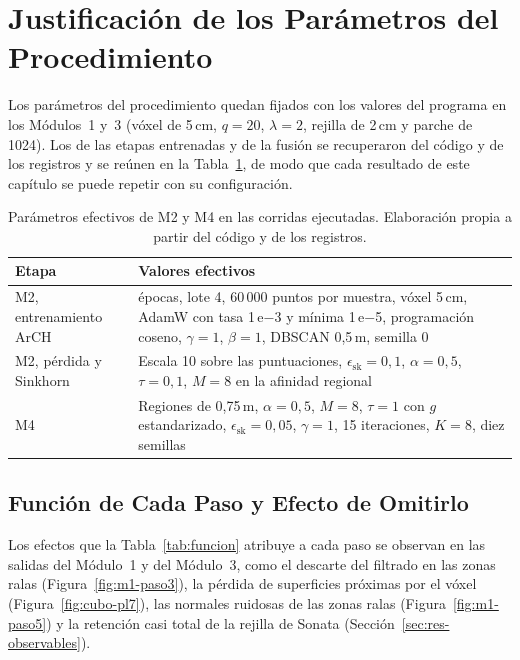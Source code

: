 \section[Justificación de los Parámetros del Procedimiento]{Justificación de los Parámetros del Procedimiento}
\label{sec:res-parametros}

Los parámetros del procedimiento quedan fijados con los valores del
programa en los Módulos~1 y~3 (vóxel de 5\,cm, $q=20$, $\lambda=2$, rejilla de 2\,cm y
parche de 1024). Los de las etapas entrenadas y de la fusión se recuperaron del código
y de los registros y se reúnen en la Tabla~\ref{tab:res-parametros}, de modo que cada
resultado de este capítulo se puede repetir con su configuración.

\begin{table}[!htbp]
\centering
{}\small
\caption[Parámetros efectivos de M2 y M4]{Parámetros efectivos de M2 y M4 en las corridas ejecutadas. Elaboración propia a partir del código y de los registros.}
\label{tab:res-parametros}
\begin{tabularx}{\linewidth}{@{}l>{\raggedright\arraybackslash}X@{}}
\toprule
\textbf{Etapa} & \textbf{Valores efectivos} \\
\midrule
M2, entrenamiento ArCH & 30 épocas, lote 4, 60\,000 puntos por muestra, vóxel 5\,cm, AdamW con tasa 1\,e$-$3 y mínima 1\,e$-$5, programación coseno, $\gamma=1$, $\beta=1$, DBSCAN 0{,}5\,m, semilla 0 \\
M2, pérdida y Sinkhorn & Escala 10 sobre las puntuaciones, $\epsilon_{\mathrm{sk}}=0{,}1$, $\alpha=0{,}5$, $\tau=0{,}1$, $M=8$ en la afinidad regional \\
M4 & Regiones de 0{,}75\,m, $\alpha=0{,}5$, $M=8$, $\tau=1$ con $g$ estandarizado, $\epsilon_{\mathrm{sk}}=0{,}05$, $\gamma=1$, 15 iteraciones, $K=8$, diez semillas \\
\bottomrule
\end{tabularx}
\end{table}

\FloatBarrier
\subsection[Función de Cada Paso y Efecto de Omitirlo]{Función de Cada Paso y Efecto de Omitirlo}

Los efectos que la Tabla~\ref{tab:funcion} atribuye a cada paso se observan en las
salidas del Módulo~1 y del Módulo~3, como el descarte del filtrado en las zonas ralas
(Figura~\ref{fig:m1-paso3}), la pérdida de superficies próximas por el vóxel
(Figura~\ref{fig:cubo-pl7}), las normales ruidosas de las zonas ralas
(Figura~\ref{fig:m1-paso5}) y la retención casi total de la rejilla de Sonata
(Sección~\ref{sec:res-observables}).

